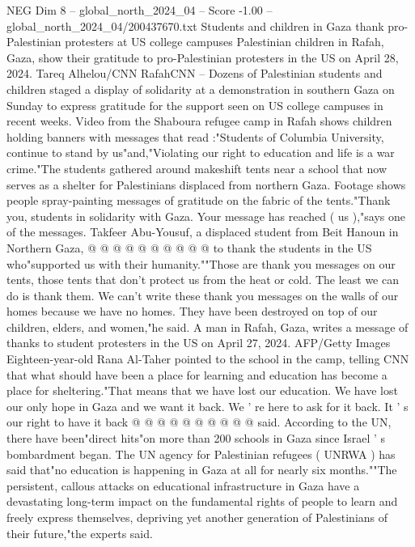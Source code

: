 \begin{textsample}{NEG Dim 8 – global\_north\_2024\_04 – Score -1.00 – global\_north\_2024\_04/200437670.txt}  \label{ex:f8_neg_399}
Students and children in Gaza thank pro-Palestinian protesters at US college campuses Palestinian children in Rafah, Gaza, show their gratitude to pro-Palestinian protesters in the US on April 28, 2024.
Tareq Alhelou/CNN RafahCNN -- Dozens of Palestinian students and children staged a display of solidarity at a demonstration in southern Gaza on Sunday to express gratitude for the support seen on US college campuses in recent weeks.
Video from the Shaboura refugee camp in Rafah shows children holding banners with messages that read :"Students of Columbia University, continue to stand by us"and,"Violating our right to education and life is a war crime."The students gathered around makeshift tents near a school that now serves as a shelter for Palestinians displaced from northern Gaza.
Footage shows people spray-painting messages of gratitude on the fabric of the tents."Thank you, students in solidarity with Gaza.
Your message has reached ( us ),"says one of the messages.
Takfeer Abu-Yousuf, a displaced student from Beit Hanoun in Northern Gaza, @ @ @ @ @ @ @ @ @ @ to thank the students in the US who"supported us with their humanity.""Those are thank you messages on our tents, those tents that don't protect us from the heat or cold.
The least we can do is thank them.
We can't write these thank you messages on the walls of our homes because we have no homes.
They have been destroyed on top of our children, elders, and women,"he said.
A man in Rafah, Gaza, writes a message of thanks to student protesters in the US on April 27, 2024.
AFP/Getty Images Eighteen-year-old Rana Al-Taher pointed to the school in the camp, telling CNN that what should have been a place for learning and education has become a place for sheltering."That means that we have lost our education.
We have lost our only hope in Gaza and we want it back.
We ' re here to ask for it back.
It ' s our right to have it back @ @ @ @ @ @ @ @ @ @ said.
According to the UN, there have been"direct hits"on more than 200 schools in Gaza since Israel ' s bombardment began.
The UN agency for Palestinian refugees ( UNRWA ) has said that"no education is happening in Gaza at all for nearly six months.""The persistent, callous attacks on educational infrastructure in Gaza have a devastating long-term impact on the fundamental rights of people to learn and freely express themselves, depriving yet another generation of Palestinians of their future,"the experts said.

\end{textsample}
